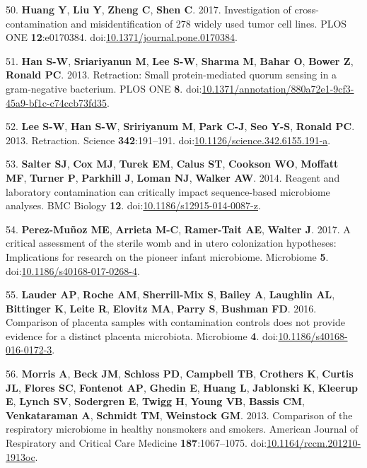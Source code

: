 \documentclass[]{article}
\begin{document}
\hypertarget{ref-Huang2017}{}
50. \textbf{Huang Y}, \textbf{Liu Y}, \textbf{Zheng C}, \textbf{Shen C}.
2017. Investigation of cross-contamination and misidentification of 278
widely used tumor cell lines. PLOS ONE \textbf{12}:e0170384.
doi:\href{https://doi.org/10.1371/journal.pone.0170384}{10.1371/journal.pone.0170384}.

\hypertarget{ref-Han2013}{}
51. \textbf{Han S-W}, \textbf{Sriariyanun M}, \textbf{Lee S-W},
\textbf{Sharma M}, \textbf{Bahar O}, \textbf{Bower Z}, \textbf{Ronald
PC}. 2013. Retraction: Small protein-mediated quorum sensing in a
gram-negative bacterium. PLOS ONE \textbf{8}.
doi:\href{https://doi.org/10.1371/annotation/880a72e1-9cf3-45a9-bf1c-c74ccb73fd35}{10.1371/annotation/880a72e1-9cf3-45a9-bf1c-c74ccb73fd35}.

\hypertarget{ref-Lee2013}{}
52. \textbf{Lee S-W}, \textbf{Han S-W}, \textbf{Sririyanum M},
\textbf{Park C-J}, \textbf{Seo Y-S}, \textbf{Ronald PC}. 2013.
Retraction. Science \textbf{342}:191--191.
doi:\href{https://doi.org/10.1126/science.342.6155.191-a}{10.1126/science.342.6155.191-a}.

\hypertarget{ref-Salter2014}{}
53. \textbf{Salter SJ}, \textbf{Cox MJ}, \textbf{Turek EM},
\textbf{Calus ST}, \textbf{Cookson WO}, \textbf{Moffatt MF},
\textbf{Turner P}, \textbf{Parkhill J}, \textbf{Loman NJ},
\textbf{Walker AW}. 2014. Reagent and laboratory contamination can
critically impact sequence-based microbiome analyses. BMC Biology
\textbf{12}.
doi:\href{https://doi.org/10.1186/s12915-014-0087-z}{10.1186/s12915-014-0087-z}.

\hypertarget{ref-PerezMuoz2017}{}
54. \textbf{Perez-Muñoz ME}, \textbf{Arrieta M-C}, \textbf{Ramer-Tait
AE}, \textbf{Walter J}. 2017. A critical assessment of the sterile womb
and in utero colonization hypotheses: Implications for research on the
pioneer infant microbiome. Microbiome \textbf{5}.
doi:\href{https://doi.org/10.1186/s40168-017-0268-4}{10.1186/s40168-017-0268-4}.

\hypertarget{ref-Lauder2016}{}
55. \textbf{Lauder AP}, \textbf{Roche AM}, \textbf{Sherrill-Mix S},
\textbf{Bailey A}, \textbf{Laughlin AL}, \textbf{Bittinger K},
\textbf{Leite R}, \textbf{Elovitz MA}, \textbf{Parry S}, \textbf{Bushman
FD}. 2016. Comparison of placenta samples with contamination controls
does not provide evidence for a distinct placenta microbiota. Microbiome
\textbf{4}.
doi:\href{https://doi.org/10.1186/s40168-016-0172-3}{10.1186/s40168-016-0172-3}.

\hypertarget{ref-Morris2013}{}
56. \textbf{Morris A}, \textbf{Beck JM}, \textbf{Schloss PD},
\textbf{Campbell TB}, \textbf{Crothers K}, \textbf{Curtis JL},
\textbf{Flores SC}, \textbf{Fontenot AP}, \textbf{Ghedin E},
\textbf{Huang L}, \textbf{Jablonski K}, \textbf{Kleerup E},
\textbf{Lynch SV}, \textbf{Sodergren E}, \textbf{Twigg H}, \textbf{Young
VB}, \textbf{Bassis CM}, \textbf{Venkataraman A}, \textbf{Schmidt TM},
\textbf{Weinstock GM}. 2013. Comparison of the respiratory microbiome in
healthy nonsmokers and smokers. American Journal of Respiratory and
Critical Care Medicine \textbf{187}:1067--1075.
doi:\href{https://doi.org/10.1164/rccm.201210-1913oc}{10.1164/rccm.201210-1913oc}.
\end{document}

